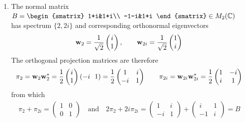 \begin{examples}{}{}
\begin{enumerate}
	  \item The normal matrix $B=
	  \begin{smatrix}
			1+i&1+i\\
			-1-i&1+i
	  \end{smatrix}
	  \in M_2(\C)$ has spectrum $\{2,2i\}$ and corresponding orthonormal eigenvectors
		\[
			{\mathbf{w}}_2=\frac 1{\sqrt 2}\begin{pmatrix}i\\1\end{pmatrix},\qquad 
			{\mathbf{w}}_{2i}=\frac 1{\sqrt 2}\begin{pmatrix}1\\i\end{pmatrix}
		\]
		The orthogonal projection matrices are therefore
		\[
			\pi_2=\vw_2\vw_2^*=\frac 12\twovec i1(-i\ \ 1)=\frac 12
			\begin{pmatrix}
				1&i\\
				-i&1
			\end{pmatrix}
			\qquad 
			\pi_{2i}=\vw_{2i}\vw_{2i}^*=\frac 12
			\begin{pmatrix}
				1&-i\\
				i&1
			\end{pmatrix}
		\]
		from which
		\begin{gather*}
			\pi_2+\pi_{2i}=
			\begin{pmatrix}
				1&0\\
				0&1
			\end{pmatrix}
			\quad\text{and}\quad
			2\pi_2+2i\pi_{2i}=
			\begin{pmatrix}
				1&i\\
				-i&1
			\end{pmatrix}
			+
			\begin{pmatrix}
				i&1\\
				-1&i
			\end{pmatrix}
			=B
		\end{gather*}
	

\end{enumerate}
\end{examples}

